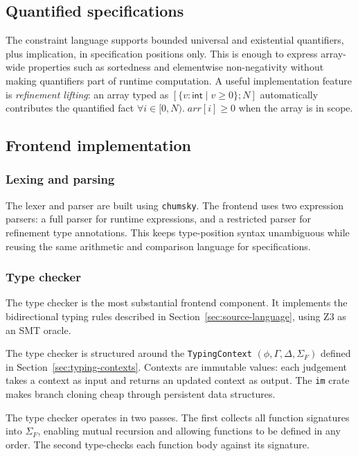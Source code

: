 \subsection{Quantified specifications}

The constraint language supports bounded universal and existential quantifiers, plus implication, in specification positions only. This is enough to express array-wide properties such as sortedness and elementwise non-negativity without making quantifiers part of runtime computation. A useful implementation feature is \textit{refinement lifting}: an array typed as $[\{v\!:\!\textsf{int} \mid v \ge 0\}; N]$ automatically contributes the quantified fact $\forall i \in [0, N).\; \mathit{arr}[i] \ge 0$ when the array is in scope.

\subsection{Frontend implementation}\label{sec:frontend}

\subsubsection{Lexing and parsing}

The lexer and parser are built using \texttt{chumsky}. The frontend uses two expression parsers: a full parser for runtime expressions, and a restricted parser for refinement type annotations. This keeps type-position syntax unambiguous while reusing the same arithmetic and comparison language for specifications.

\subsubsection{Type checker}\label{sec:typechecker}

The type checker is the most substantial frontend component. It implements the bidirectional typing rules described in Section~\ref{sec:source-language}, using Z3 as an SMT oracle.

The type checker is structured around the \texttt{TypingContext} $(\phi, \Gamma, \Delta, \Sigma_F)$ defined in Section~\ref{sec:typing-contexts}. Contexts are immutable values: each judgement takes a context as input and returns an updated context as output. The \texttt{im} crate makes branch cloning cheap through persistent data structures.

The type checker operates in two passes. The first collects all function signatures into $\Sigma_F$, enabling mutual recursion and allowing functions to be defined in any order. The second type-checks each function body against its signature.

